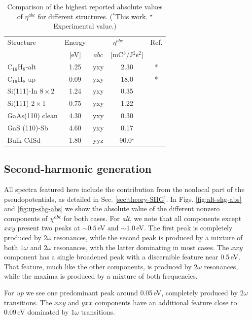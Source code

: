 \documentclass[pss]{wiley2sp} %
\begin{document}
\begin{table}%
  \sidecaption
  \begin{tabular}{lcccc}
  \hline
    Structure & Energy &  \multicolumn{2}{c}{$\eta^{abc}$} &  Ref.\\
    \cline{3-4}
              & [eV]   & $abc$ & [mC$^{3}$/J$^{2}$s$^{2}$] \\
    \hline
    C$_{16}$H$_{8}$-alt     & 1.25  & yxy & 2.30  & *     \\
    C$_{16}$H$_{8}$-up      & 0.09  & yxy & 18.0  & *     \\
    Si(111)-In $8\times2$   & 1.24  & yxy & 0.35  & \cite{arzatePRB14}  \\
    Si(111) $2\times1$      & 0.75  & yxy & 1.22  & \cite{mendozaPRB12} \\
    GaAs(110) clean         & 4.30  & yxy & 0.30  & \cite{nastosPRB07}     \\
    GaS (110)-Sb            & 4.60  & yxy & 0.17  & \cite{cabellosPRB11}\\
    Bulk CdSd               & 1.80  & yyz & 90.0$^{\star}$  & \cite{lamanAPL99}  \\
  \hline
  \end{tabular}
  \caption[]{%
  Comparison of the highest reported absolute values of {$\eta^{abc}$} for 
    different structures. ($^{*}$This work. $^{\star}$Experimental value.)}
  \label{tab:etacomp}
\end{table}

\subsection{Second-harmonic generation}
All spectra featured here include the contribution from the nonlocal part of
the pseudopotentials, as detailed in Sec. \ref{sec:theory-SHG}. In Figs.
\ref{fig:alt-shg-abs} and \ref{fig:up-shg-abs} we show the absolute value of the different nonzero
components of $\chi^{abc}$ for both cases. For \emph{alt}, we note that all
components except $xxy$ present two peaks at $\sim0.5$\,eV and $\sim1.0$\,eV.
The first peak is completely produced by $2\omega$ resonances, while the
second peak is produced by a mixture of both $1\omega$ and $2\omega$
resonances, with the latter dominating in most cases. The $xxy$ component has
a single broadened peak with a discernible feature near 0.5\,eV. That feature,
much like the other components, is produced by $2\omega$ resonances, while the
maxima is produced by a mixture of both frequencies.

For \emph{up} we see one predominant peak around 0.05\,eV, completely produced
by $2\omega$ transitions. The $xxy$ and $yxx$ components have an additional
feature close to 0.09\,eV dominated by $1\omega$ transitions.
\end{document}
